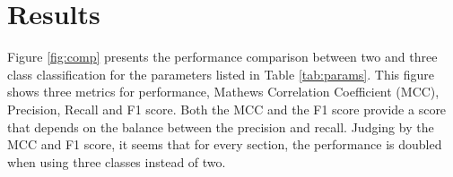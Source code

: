 \section{Results}

Figure \ref{fig:comp} presents the performance comparison between two and three class classification for the parameters listed in Table \ref{tab:params}. This figure shows three metrics for performance, Mathews Correlation Coefficient (MCC), Precision, Recall and F1 score. Both the MCC and the F1 score provide a score that depends on the balance between the precision and recall. Judging by the MCC and F1 score, it seems that for every section, the performance is doubled when using three classes instead of two.


\datazero
{}\dataone
{}\datatwo
{}\datafone


